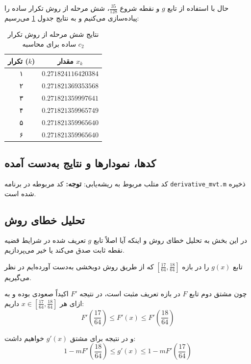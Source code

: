 \documentclass[12pt,a4paper]{article}
\begin{document}
حال با استفاده از تابع $g$ و نقطه شروع $\frac{35}{128}$، شش مرحله از روش تکرار ساده را پیاده‌سازی می‌کنیم و به نتایج جدول \ref{tab:fixed_point_results} می‌رسیم:

\begin{table}[h!]
\centering
\caption{نتایج شش مرحله از روش تکرار ساده برای محاسبه $c_2$}
\label{tab:fixed_point_results}
\vspace{0.2cm}
\begin{tabular}{cc}
\toprule
\textbf{تکرار ($k$)} & \textbf{مقدار $x_k$} \\
\midrule
۱ & $0.271824116420384$ \\
۲ & $0.271821369353568$ \\
۳ & $0.271821359997641$ \\
۴ & $0.271821359965749$ \\
۵ & $0.271821359965640$ \\
۶ & $0.271821359965640$ \\
\bottomrule
\end{tabular}
\end{table}


\subsection{کدها، نمودارها و نتایج به‌دست آمده}
کد متلب مربوط به ریشه‌یابی:
\textbf{توجه:} کد مربوطه در برنامه \texttt{derivative\_mvt.m} ذخیره شده است.




\subsection{تحلیل خطای روش}
در این بخش به تحلیل خطای روش و اینکه آیا اصلاً تابع $g$ تعریف شده در شرایط قضیه نقطه ثابت صدق می‌کند یا خیر می‌پردازیم.

تابع $g(x)$ را در بازه $\left[\frac{17}{64}, \frac{18}{64}\right]$ که از طریق روش دوبخشی به‌دست آورده‌ایم در نظر می‌گیریم. 

چون مشتق دوم تابع $F$ در بازه تعریف مثبت است، در نتیجه $F'$ اکیداً صعودی بوده و به ازای هر $x \in \left[\frac{17}{64}, \frac{18}{64}\right]$ داریم:
\begin{equation}
F'\left(\frac{17}{64}\right) \le F'(x) \le F'\left(\frac{18}{64}\right)
\end{equation}

و در نتیجه برای مشتق $g'(x)$ خواهیم داشت:
\begin{equation*}
1 - m F'\left(\frac{18}{64}\right) \le g'(x) \le 1 - m F'\left(\frac{17}{64}\right)
\end{equation*}
\end{document}
